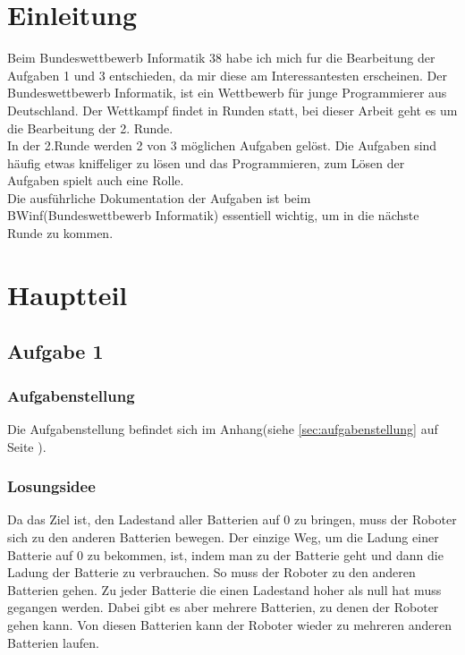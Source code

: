 \documentclass[a4paper,12pt,arial]{scrartcl}
\begin{document}
\section{Einleitung}
Beim Bundeswettbewerb Informatik 38 habe ich mich fur die Bearbeitung der Aufgaben 1 und 3 entschieden, da mir diese am Interessantesten erscheinen. Der Bundeswettbewerb Informatik, ist ein Wettbewerb für junge Programmierer aus Deutschland. Der Wettkampf findet in Runden statt, bei dieser Arbeit geht es um die Bearbeitung der 2. Runde.
\\
In der 2.Runde werden 2 von 3 möglichen Aufgaben gelöst. Die Aufgaben sind häufig etwas kniffeliger zu lösen und das Programmieren, zum Lösen der Aufgaben spielt auch eine Rolle.\\
Die ausführliche Dokumentation der Aufgaben ist beim BWinf(Bundeswettbewerb Informatik) essentiell wichtig, um in die nächste Runde zu kommen.
\section{Hauptteil}
\newpage
\subsection{Aufgabe 1}
\subsubsection{Aufgabenstellung}
Die Aufgabenstellung befindet sich im Anhang(siehe \ref{sec:aufgabenstellung} auf Seite \pageref{sec:aufgabenstellung}).\textit{\textcite{bwinfSpielfeld}}
\subsubsection{Losungsidee}
Da das Ziel ist, den Ladestand aller Batterien auf 0 zu bringen, muss der Roboter sich zu den anderen Batterien bewegen.
Der einzige Weg, um die Ladung einer Batterie auf 0 zu bekommen, ist, indem man zu der Batterie geht und dann die Ladung der Batterie zu verbrauchen.
So muss der Roboter zu den anderen Batterien gehen. Zu jeder Batterie  die einen Ladestand hoher als null hat muss gegangen werden.
Dabei gibt es aber mehrere Batterien, zu denen der Roboter gehen kann.
Von diesen Batterien kann der Roboter wieder zu mehreren anderen Batterien laufen.
\par
\end{document}
